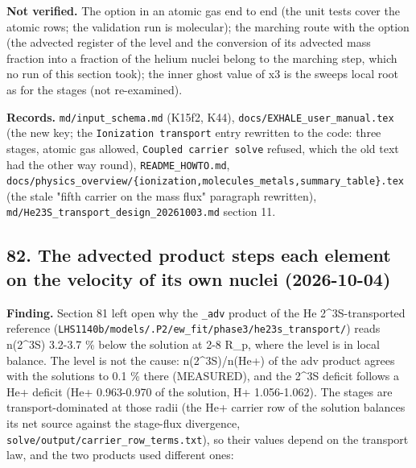 \documentclass[english,a4paper]{my_memo}
\begin{document}
\textbf{Not verified.} The option in an atomic gas end to end (the unit tests
cover the atomic rows; the validation run is molecular); the marching route
with the option (the advected register of the level and the conversion of
its advected mass fraction into a fraction of the helium nuclei belong to
the marching step, which no run of this section took); the inner ghost value of x3 is the
sweep\textquotesingle s local root as for the stages (not re-examined).

\textbf{Records.} \texttt{md/input\_schema.md} (K15f2, K44), \texttt{docs/EXHALE\_user\_manual.tex}
(the new key; the \texttt{Ionization\ transport} entry rewritten to the code: three
stages, atomic gas allowed, \texttt{Coupled\ carrier\ solve} refused, which the old
text had the other way round), \texttt{README\_HOWTO.md},
\texttt{docs/physics\_overview/\{ionization,molecules\_metals,summary\_table\}.tex}
(the stale "fifth carrier on the mass flux" paragraph rewritten),
\texttt{md/He23S\_transport\_design\_20261003.md} section 11.

\subsection{82. The advected product steps each element on the velocity of its own nuclei (2026-10-04)}\label{82-the-advected-product-steps-each-element-on-the-velocity-of-its-own-nuclei-2026-10-04}

\textbf{Finding.} Section 81 left open why the \texttt{\_adv} product of the
He 2\^{}3S-transported reference (\texttt{LHS1140b/models/.P2/ew\_fit/phase3/he23s\_transport/})
reads n(2\^{}3S) 3.2-3.7 \% below the solution at 2-8 R\_p, where the level is in
local balance. The level is not the cause: n(2\^{}3S)/n(He+) of the adv
product agrees with the solution\textquotesingle s to 0.1 \% there (MEASURED), and the 2\^{}3S
deficit follows a He+ deficit (He+ 0.963-0.970 of the solution, H+
1.056-1.062). The stages are transport-dominated at those radii (the He+
carrier row of the solution balances its net source against the stage-flux
divergence, \texttt{solve/output/carrier\_row\_terms.txt}), so their values depend
on the transport law, and the two products used different ones:
\end{document}
